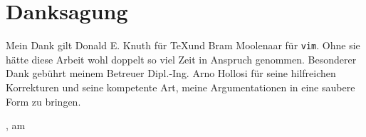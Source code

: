 
\chapter*{Danksagung}

Mein Dank gilt Donald E. Knuth für \TeX und Bram Moolenaar für \texttt{vim}. Ohne sie hätte diese Arbeit wohl doppelt so viel Zeit in Anspruch genommen.
Besonderer Dank gebührt meinem Betreuer Dipl.-Ing. Arno Hollosi für seine hilfreichen Korrekturen und seine kompetente Art, meine Argumentationen in eine
saubere Form zu bringen.

\vspace{1.5cm}

\begin{center}
\raggedleft{\campusAuthor}
\end{center}

\vspace{1.5cm}

\campusCity, am \campusDate
